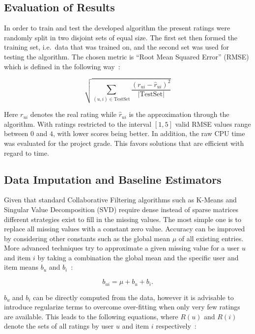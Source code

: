 \documentclass[10pt,conference,compsocconf]{IEEEtran}
\newcommand{\abs}[1]{\left\lvert#1\right\rvert}
\begin{document}
\subsection{Evaluation of Results}
\label{sub:evaluation_of_results}

In order to train and test the developed algorithm the present ratings were
randomly split in two disjoint sets of equal size. The first set then formed
the training set, i.e.\ data that was trained on, and the second set was used
for testing the algorithm. The chosen metric is ``Root Mean Squared Error''
(RMSE) which is defined in the following way~\cite{koren2008factorization,
  koren2010factor, koren2011advances}:

\begin{equation}
  \sqrt{\sum_{(u,i) \in \mathrm{TestSet}}
    \frac{{(r_{ui} - \hat{r}_{ui})}^2}{\abs{\mathrm{TestSet}}}}
\end{equation}

Here $r_{ui}$ denotes the real rating while $\hat{r}_{ui}$ is the approximation
through the algorithm. With ratings restricted to the interval $[1,5]$ valid
RMSE values range between $0$ and $4$, with lower scores being better. In
addition, the raw CPU time was evaluated for the project grade. This favors
solutions that are efficient with regard to time.

\subsection{Data Imputation and Baseline Estimators}
\label{sub:data_imputation_and_baseline_estimators}

Given that standard Collaborative Filtering algorithms such as K-Means and
Singular Value Decomposition (SVD) require dense instead of sparse matrices
different strategies exist to fill in the missing values. The most simple one is
to replace all missing values with a constant zero value. Accuracy can be
improved by considering other constants such as the global mean $\mu$ of all
existing entries.  More advanced techniques try to approximate a given missing
value for a user $u$ and item $i$ by taking a combination the global mean and
the specific user and item means $b_u$ and $b_i$~\cite{koren2008factorization,
  koren2009matrix, koren2010factor, koren2011advances}:

\begin{equation}
  b_{ui} = \mu + b_u + b_i.
\end{equation}

$b_u$ and $b_i$ can be directly computed from the data, however it is advisable
to introduce regularize terms to overcome over-fitting when only very few
ratings are available. This leads to the following equations, where $R(u)$ and
$R(i)$ denote the sets of all ratings by user $u$ and item $i$
respectively~\cite{koren2008factorization, koren2009matrix, koren2010factor,
  koren2011advances}:
\end{document}
